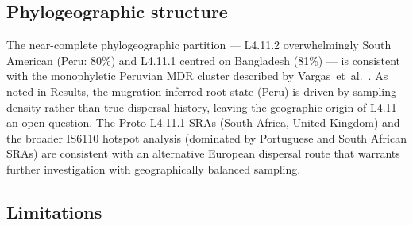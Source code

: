 \documentclass[11pt,a4paper]{article}
\newcommand{\lignee}[1]{\textsf{#1}}
\begin{document}
\subsection{Phylogeographic structure}

The near-complete phylogeographic partition --- \lignee{L4.11.2}
overwhelmingly South American (Peru: 80\%) and \lignee{L4.11.1} centred
on Bangladesh (81\%) --- is consistent with the monophyletic Peruvian MDR
cluster described by Vargas~et~al.~\cite{vargas2023}.
As noted in Results, the mugration-inferred root state (Peru) is driven
by sampling density rather than true dispersal history, leaving the
geographic origin of \lignee{L4.11} an open question.
The Proto-\lignee{L4.11.1} SRAs (South Africa, United Kingdom) and the
broader IS6110 hotspot analysis (dominated by Portuguese and South African
SRAs) are consistent with an alternative European dispersal route that
warrants further investigation with geographically balanced sampling.

\subsection{Limitations}
\label{sec:limitations}
\end{document}
